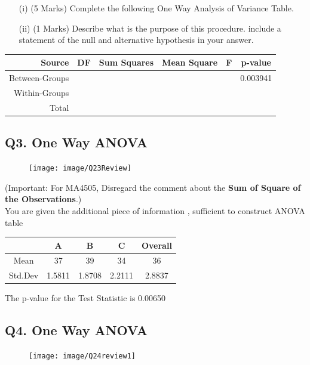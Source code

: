 \documentclass[a4paper,12pt]{article}
\begin{document}
	\begin{itemize}
		\item[(i)] (5 Marks) Complete the following One Way Analysis of Variance Table.
		\item[(ii)] (1 Marks) Describe what is the purpose of this procedure. include a statement of the null and alternative hypothesis in your answer.
	\end{itemize}
	\begin{tabular}{|r|c|c|c|c|c|}
		\hline Source  &\phantom{sp} DF \phantom{sp} & Sum Squares & Mean Square  & \phantom{sp} F \phantom{sp} & p-value  \\ 
		\hline Between-Groups &  &  &  &  & 0.003941 \\ 
		\hline Within-Groups &  &  &  &  &  \\ \hline
		\hline Total &  &  &  &  &  \\ 
		\hline 
	\end{tabular} 
	
\newpage
	
\subsection*{Q3. One Way ANOVA } %


\begin{figure}[h!]
	\centering
	\texttt{[image: image/Q23Review]}
\end{figure}
\noindent (Important: For MA4505, Disregard the comment about the \textbf{Sum of Square of the Observations}.)\\
You are given the additional piece of information , sufficient to construct ANOVA table

{
	\Large
	\begin{center}
		\begin{tabular}{|c|c|c|c||c|} 
			\hline  & A & B & C & Overall \\ 
			\hline Mean & 37 & 39& 34 &36 \\ 
			\hline Std.Dev &  1.5811 & 1.8708 & 2.2111 & 2.8837 \\
			
			\hline 
		\end{tabular}
	\end{center}
}
The p-value for the Test Statistic is 0.00650

\newpage
\subsection*{Q4. One Way ANOVA }
\begin{figure}[h!]
	\centering
	\texttt{[image: image/Q24review1]}
	
\end{figure}
\end{document}
